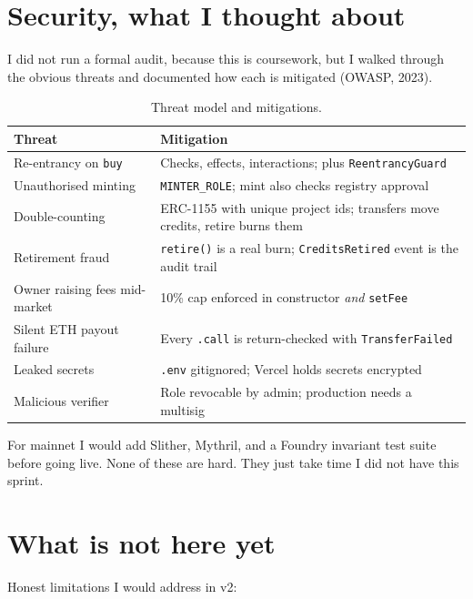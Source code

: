 \documentclass[11pt,a4paper]{article}
\begin{document}
\section{Security, what I thought about}
I did not run a formal audit, because this is coursework, but I walked
through the obvious threats and documented how each is mitigated
(OWASP, 2023).

\begin{table}[H]
\centering
\small
\begin{tabularx}{\linewidth}{lX}
\toprule
\textbf{Threat} & \textbf{Mitigation} \\
\midrule
Re-entrancy on \texttt{buy}   & Checks, effects, interactions; plus \texttt{ReentrancyGuard} \\
Unauthorised minting          & \texttt{MINTER\_ROLE}; mint also checks registry approval \\
Double-counting               & ERC-1155 with unique project ids; transfers move credits, retire burns them \\
Retirement fraud              & \texttt{retire()} is a real burn; \texttt{CreditsRetired} event is the audit trail \\
Owner raising fees mid-market & 10\% cap enforced in constructor \emph{and} \texttt{setFee} \\
Silent ETH payout failure     & Every \texttt{.call} is return-checked with \texttt{TransferFailed} \\
Leaked secrets                & \texttt{.env} gitignored; Vercel holds secrets encrypted \\
Malicious verifier            & Role revocable by admin; production needs a multisig \\
\bottomrule
\end{tabularx}
\caption{Threat model and mitigations.}
\end{table}

For mainnet I would add Slither, Mythril, and a Foundry invariant test
suite before going live. None of these are hard. They just take time I
did not have this sprint.

\section{What is not here yet}
Honest limitations I would address in v2:
\end{document}

